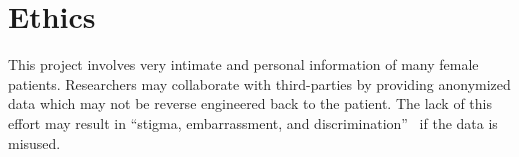 \documentclass[11pt,twoside]{report}
\begin{document}



\chapter{Ethics}\label{sect:ethics}

This project involves very intimate and personal information of many female patients. Researchers may collaborate with third-parties by providing anonymized data which may not be reverse engineered back to the patient.
The lack of this effort may result in ``stigma, embarrassment, and discrimination''~\cite{health-privacy} if the data is misused.
\end{document}
